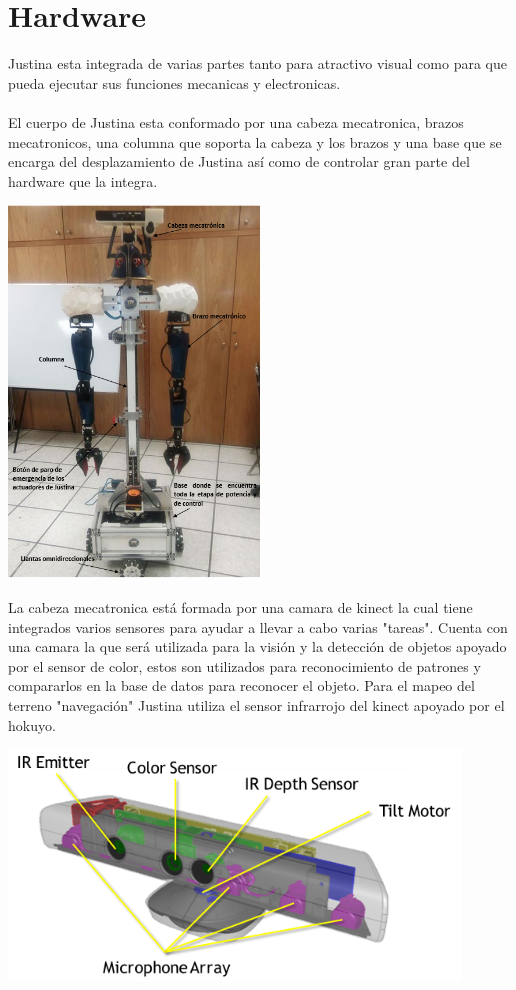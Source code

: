 \documentclass[a4paper]{book}
\begin{document}
\chapter{Hardware}
Justina esta integrada de varias partes tanto para atractivo visual como para que pueda ejecutar sus funciones mecanicas y 
electronicas.\\
\\
El cuerpo de Justina esta conformado por una cabeza mecatronica, brazos mecatronicos, una columna que soporta la cabeza y 
los brazos y una base que se encarga del desplazamiento de Justina así como de controlar gran parte del hardware que la 
integra.


\begin{center}
\includegraphics[width=0.5\textwidth]{Figures/Hardware/Diagramas/Cuerpo.png}
\label{fig:Hardware:Diagramas:Justina:Completa}
\end{center}
 
 La cabeza mecatronica está formada por una camara de kinect la cual tiene integrados varios sensores para ayudar a
 llevar a cabo varias "tareas". Cuenta con una camara la que será utilizada para la visión y la detección de objetos
 apoyado por el sensor de color, estos son utilizados para reconocimiento de patrones y compararlos en la base de datos
 para reconocer el objeto. Para el mapeo del terreno "navegación" Justina utiliza el sensor infrarrojo del kinect apoyado
 por el hokuyo.

\begin{center}
\includegraphics[width=0.9\textwidth]{Figures/Hardware/Partes/Kinect_sensors.png}
\label{fig:Hardware:Diagramas:Justina:Vision:Kinect}
\end{center}
\end{document}
